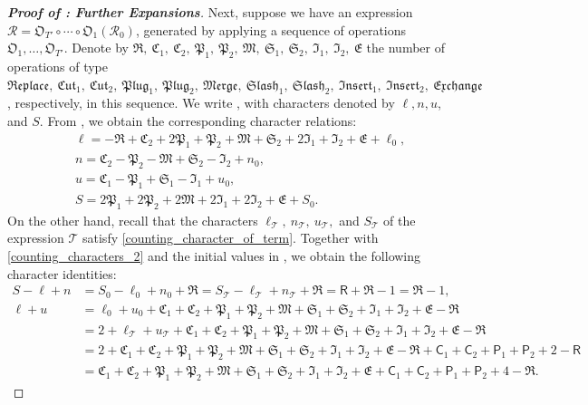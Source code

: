\documentclass[10pt,reqno]{amsart}
\numberwithin{equation}{section}
\numberwithin{figure}{section}
\theoremstyle{plain} %
\theoremstyle{definition} %
\newcommand{\cW}{{\mathcal W}}
\newcommand{\cT}{\mathcal T}
\newcommand{\cR}{{\mathcal R}}
\newcommand{\fR}{\mathfrak R}
\newcommand{\fC}{\mathfrak C}
\newcommand{\fP}{\mathfrak P}
\newcommand{\fM}{\mathfrak M}
\newcommand{\fS}{\mathfrak S}
\newcommand{\fI}{\mathfrak I}
\newcommand{\fE}{\mathfrak E}
\newcommand{\fO}{\mathfrak O}
\newcommand{\sR}{\mathsf R}
\newcommand{\sC}{\mathsf C}
\newcommand{\sP}{\mathsf P}
\newcommand{\pa}[1]{\left({#1}\right)}
\newcommand{\freplace}{\mathfrak{Replace}}
\newcommand{\fcut}[1]{\mathfrak{Cut}_{#1}}
\newcommand{\fplug}[1]{\mathfrak{Plug}_{#1}}
\newcommand{\finsert}[1]{\mathfrak{Insert}_{#1}}
\newcommand{\fexchange}{\mathfrak{Exchange}}
\newcommand{\fmerge}{\mathfrak{Merge}}
\newcommand{\fslash}[1]{\mathfrak{Slash}_{#1}}
\newcommand{\mm}{\ell}
\numberwithin{equation}{section}
\begin{document}
\begin{proof}[\bf Proof of : Further Expansions]
    Next, suppose we have an expression $\cR=\fO_{T'}\circ\cdots\circ \fO_{1}\pa{\cR_0}$, generated by applying a sequence of operations $\fO_{1},\ldots,\fO_{T'}$. Denote by $\fR,\ \fC_1,\ \fC_2,\ \fP_1,\ \fP_2,\ \fM,\ \fS_1,\ \fS_2,\ \fI_1,\ \fI_2,\ \fE$ the number of operations of type $\freplace,\ \fcut{1},\ \fcut{2},\ \fplug{1},\ \fplug{2},\ \fmerge,\ \fslash{1},\ \fslash{2},\ \finsert{1},\ \finsert{2},\ \fexchange$, respectively, in this sequence. We write \smash{$\cR=c_\cR\cdot \cW^{\pa{u}}\Upsilon_{n}^{\pa{\mm}}$}, with characters denoted by $\mm, n, u$, and $S$. 
    From , we obtain the corresponding character relations:
    \begin{equation}\label{counting_characters_2}
        \begin{aligned}
            &\mm=-\fR+\fC_2+2\fP_1+\fP_2+\fM+\fS_2+2\fI_1+\fI_2+\fE+\mm_0,\\
            &n=\fC_2-\fP_2-\fM+\fS_2-\fI_2+n_0,\\
            &u=\fC_1-\fP_1+\fS_1-\fI_1+u_0,\\
            &S=2\fP_1+2\fP_2+2\fM+2\fI_1+2\fI_2+\fE+S_0.
        \end{aligned}
    \end{equation} 
On the other hand, recall that the characters $\mm_\cT,\ n_\cT,\ u_\cT,$ and $S_\cT$  of the expression $\cT$ satisfy \eqref{counting_character_of_term}. Together with \eqref{counting_characters_2} and the initial values in , we obtain the following character identities:
    \begin{align}\label{character_relation_further_expansion}
                S-\mm+n&=S_0-\mm_0+n_0+\fR=S_\cT-\mm_\cT+n_\cT+\fR=\sR+\fR-1=\fR-1,\\
                \mm+u&=\mm_0+u_0+\fC_1+\fC_2+\fP_1+\fP_2+\fM+\fS_1+\fS_2+\fI_1+\fI_2+\fE-\fR \nonumber\\
                &=2+\mm_\cT+u_\cT+\fC_1+\fC_2+\fP_1+\fP_2+\fM+\fS_1+\fS_2+\fI_1+\fI_2+\fE-\fR \nonumber\\
                & =2+\fC_1+\fC_2+\fP_1+\fP_2+\fM+\fS_1+\fS_2+\fI_1+\fI_2+\fE-\fR+\sC_1+\sC_2+\sP_1+\sP_2+2-\sR \nonumber\\
                & =\fC_1+\fC_2+\fP_1+\fP_2+\fM+\fS_1+\fS_2+\fI_1+\fI_2+\fE+\sC_1+\sC_2+\sP_1+\sP_2+4-\fR. \label{character_relation_further_expansion2}
\end{align}



\end{proof}
\end{document}
